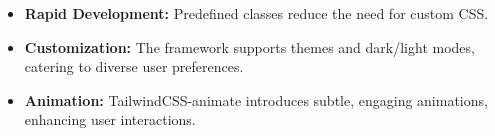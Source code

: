 \begin{enumerate}
\begin{enumerate}
\begin{itemize}
            \item \textbf{Rapid Development:}  Predefined classes reduce the need for custom CSS.
            \item \textbf{Customization:}  The framework supports themes and dark/light modes, catering to diverse user preferences.
            \item \textbf{Animation:}  TailwindCSS-animate introduces subtle, engaging animations, enhancing user interactions.
        \end{itemize}
    \end{enumerate}
    

\end{enumerate}
